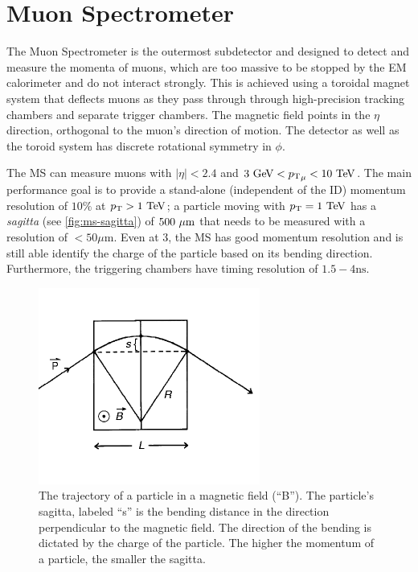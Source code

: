 \section{Muon Spectrometer}
The Muon Spectrometer is the outermost subdetector and designed to detect and measure the momenta of muons, which are too massive to be stopped by the EM calorimeter and do not interact strongly. This is achieved using a toroidal magnet system that deflects muons as they pass through through  high-precision tracking chambers and separate trigger chambers. The magnetic field points in the $\eta$ direction, orthogonal to the muon's direction of motion. The detector as well as the toroid system has discrete rotational symmetry in $\phi$.

The \ac{MS} can measure muons with $|\eta| < 2.4$ and $3 \GeV < {\pt}_{\mu} < 10 \TeV$. The main performance goal is to provide a stand-alone (independent of the \ac{ID}) momentum resolution of $10\%$ at $\pT > 1 \TeV$; a particle moving with $\pt = 1 \TeV$ has a \emph{sagitta} (see \autoref{fig:ms-sagitta}) of $500~\mu\text{m}$ that needs to be measured with a resolution of $<50\mu\textrm{m}$. Even at 3\TeV, the \ac{MS} has good momentum resolution and is still able identify the charge of the particle based on its bending direction. Furthermore, the triggering chambers have timing resolution of $1.5-4 \textrm{ns}$.  

\begin{figure}[!h]
\centering
\includegraphics[width=.6\textwidth]{figures/Detector/ms-sagitta.png}
\caption{The trajectory of a particle in a magnetic field (``B''). The particle's sagitta, labeled ``s'' is the bending distance in the direction perpendicular to the magnetic field. The direction of the bending is dictated by the charge of the particle. The higher the momentum of a particle, the smaller the sagitta. \cite{particledetectors-springer}}
\label{fig:ms-sagitta}
\end{figure}


